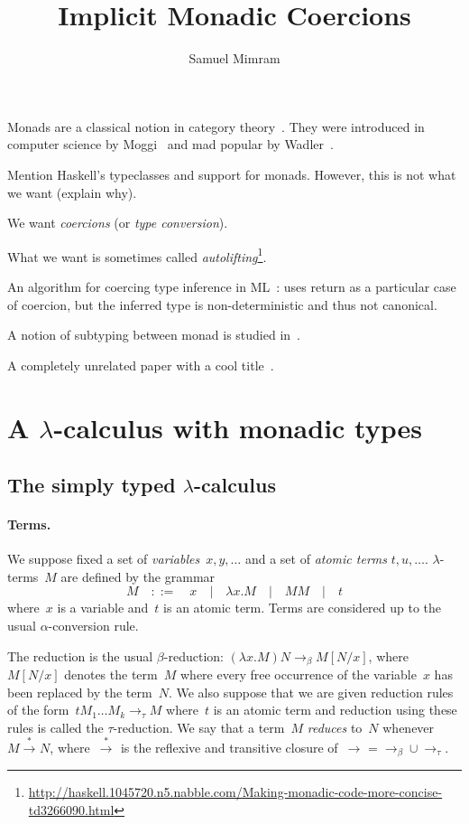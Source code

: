 \documentclass{article}
\title{Implicit Monadic Coercions}
\author{Samuel Mimram}
\theoremstyle{example}
\newcommand{\gramdef}{\quad::=\quad}
\newcommand{\gramor}{\quad|\quad}
\newcommand{\reduces}[1]{\longrightarrow_{#1}}
\newcommand{\mreduces}[1]{\overset\ast\longrightarrow_{#1}}
\begin{document}
\maketitle

Monads are a classical notion in category theory~\cite{mac1998categories}. They
were introduced in computer science by Moggi~\cite{moggi2002computational} and
mad popular by Wadler~\cite{wadler1992comprehending}.

Mention Haskell's typeclasses and support for monads. However, this is not what
we want (explain why).

We want \emph{coercions} (or \emph{type conversion}).

What we want is sometimes called
\emph{autolifting}\footnote{\url{http://haskell.1045720.n5.nabble.com/Making-monadic-code-more-concise-td3266090.html}}.

An algorithm for coercing type inference in ML~\cite{luo2008coercions}: uses
return as a particular case of coercion, but the inferred type is
non-deterministic and thus not canonical.

A notion of subtyping between monad is studied in~\cite{tolmach1998optimizing}.

A completely unrelated paper with a cool title~\cite{shalgi2008being}.


\section{A $\lambda$-calculus with monadic types}
\subsection{The simply typed $\lambda$-calculus}
\paragraph{Terms.}
We suppose fixed a set of \emph{variables}~$x,y,\ldots$ and a set of
\emph{atomic terms} $t,u,\ldots$. $\lambda$-terms~$M$ are defined by the grammar
\[
M\gramdef x\gramor\lambda x.M\gramor MM\gramor t
\]
where~$x$ is a variable and~$t$ is an atomic term. Terms are considered up to
the usual $\alpha$-conversion rule.

The reduction is the usual $\beta$-reduction: $(\lambda x.M)N\reduces\beta
M[N/x]$, where $M[N/x]$ denotes the term~$M$ where every free occurrence of the
variable~$x$ has been replaced by the term~$N$. We also suppose that we are
given reduction rules of the form~$tM_1\ldots M_k\reduces\tau M$ where~$t$ is an
atomic term and reduction using these rules is called the $\tau$-reduction. We
say that a term~$M$ \emph{reduces} to~$N$ whenever~$M\mreduces{}N$,
where~$\mreduces{}$ is the reflexive and transitive closure
of~$\reduces{}=\reduces\beta\cup\reduces\tau$.
\end{document}
